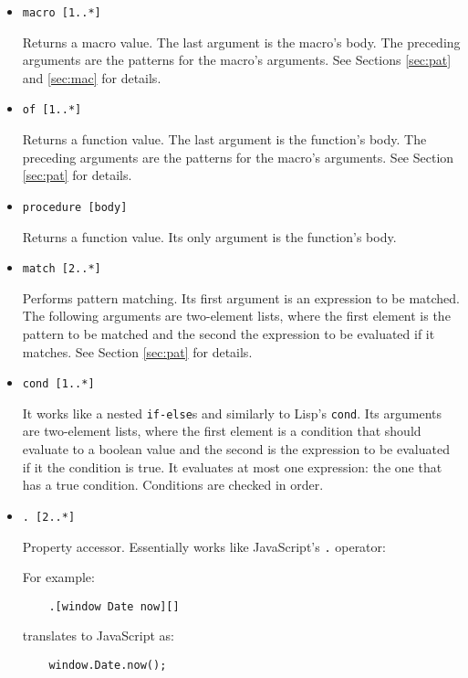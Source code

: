 \begin{itemize}
    \item \texttt{macro [1..*]}
    
    Returns a macro value. The last argument is the macro's body. The preceding arguments are the patterns for the macro's arguments. See Sections \ref{sec:pat} and \ref{sec:mac} for details.
    
    \item \texttt{of [1..*]}
    
    Returns a function value. The last argument is the function's body. The preceding arguments are the patterns for the macro's arguments. See Section \ref{sec:pat} for details.
    
    \item \texttt{procedure [body]}
    
    Returns a function value. Its only argument is the function's body.
    
    \item \texttt{match [2..*]}
    
    Performs pattern matching. Its first argument is an expression to be matched. The following arguments are two-element lists, where the first element is the pattern to be matched and the second the expression to be evaluated if it matches. See Section \ref{sec:pat} for details.
        
    \item \texttt{cond [1..*]}
    
    It works like a nested \texttt{if-else}s and similarly to Lisp's \texttt{cond}\cite[Section~5.3, Macro~COND]{common_lisp_hyperspec}. Its arguments are two-element lists, where the first element is a condition that should evaluate to a boolean value and the second is the expression to be evaluated if it the condition is true. It evaluates at most one expression: the one that has a true condition. Conditions are checked in order.
    
    \item \texttt{. [2..*]}
    
    Property accessor. Essentially works like JavaScript's \texttt{.} operator\cite{mdn_dot}:
    
    For example:
    \begin{lstlisting}
    .[window Date now][]
    \end{lstlisting}
    
    translates to JavaScript as:
    \begin{lstlisting}
    window.Date.now();
    \end{lstlisting}
    

\end{itemize}
